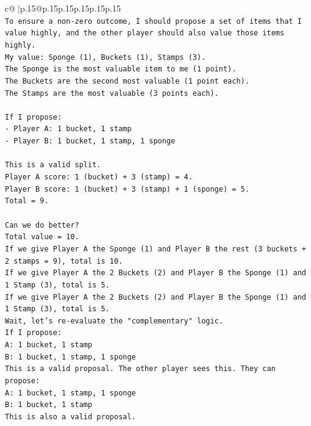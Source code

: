 \documentclass{article}
\begin{document}
{\begin{supertabular}{c@{$\;$}|p{.15\linewidth}@{}p{.15\linewidth}p{.15\linewidth}p{.15\linewidth}p{.15\linewidth}p{.15\linewidth}}
{{{\\ 
\texttt{To ensure a non{-}zero outcome, I should propose a set of items that I value highly, and the other player should also value those items highly.} \\
\texttt{My value: Sponge (1), Buckets (1), Stamps (3).} \\
\texttt{The Sponge is the most valuable item to me (1 point).} \\
\texttt{The Buckets are the second most valuable (1 point each).} \\
\texttt{The Stamps are the most valuable (3 points each).} \\
\\ 
\texttt{If I propose:} \\
\texttt{{-} Player A: 1 bucket, 1 stamp} \\
\texttt{{-} Player B: 1 bucket, 1 stamp, 1 sponge} \\
\\ 
\texttt{This is a valid split.} \\
\texttt{Player A score: 1 (bucket) + 3 (stamp) = 4.} \\
\texttt{Player B score: 1 (bucket) + 3 (stamp) + 1 (sponge) = 5.} \\
\texttt{Total = 9.} \\
\\ 
\texttt{Can we do better?} \\
\texttt{Total value = 10.} \\
\texttt{If we give Player A the Sponge (1) and Player B the rest (3 buckets + 2 stamps = 9), total is 10.} \\
\texttt{If we give Player A the 2 Buckets (2) and Player B the Sponge (1) and 1 Stamp (3), total is 5.} \\
\texttt{If we give Player A the 2 Buckets (2) and Player B the Sponge (1) and 1 Stamp (3), total is 5.} \\
\texttt{Wait, let's re{-}evaluate the "complementary" logic.} \\
\texttt{If I propose:} \\
\texttt{A: 1 bucket, 1 stamp} \\
\texttt{B: 1 bucket, 1 stamp, 1 sponge} \\
\texttt{This is a valid proposal. The other player sees this. They can propose:} \\
\texttt{A: 1 bucket, 1 stamp, 1 sponge} \\
\texttt{B: 1 bucket, 1 stamp} \\
\texttt{This is also a valid proposal.} \\
}}}
\end{supertabular}}
\end{document}
